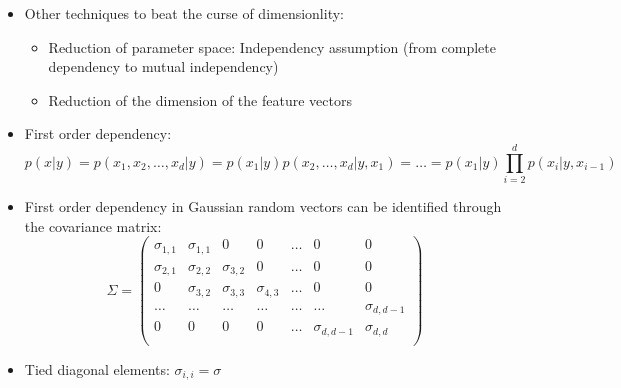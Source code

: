 \begin{itemize}
    \item
        Other techniques to beat the curse of dimensionlity:
        \begin{itemize}
            \item
                Reduction of parameter space: Independency assumption (from complete dependency to mutual independency)
            \item
                Reduction of the dimension of the feature vectors
        \end{itemize}
    \item
        First order dependency:
        $$ p(x|y) = p(x_1, x_2, \dots, x_d | y) = p(x_1|y) p( x_2, \dots, x_d | y, x_1) = \dots = p(x_1|y) \prod_{i=2}^d p(x_i|y, x_{i-1})$$
    \item
        First order dependency in Gaussian random vectors can be identified through the covariance matrix:
        $$
        \Sigma = 
        \begin{pmatrix}
            \sigma_{1,1} & \sigma_{1,1} & 0 & 0 & \dots & 0 & 0 \\ 
            \sigma_{2,1} & \sigma_{2,2} & \sigma_{3,2} & 0 & \dots & 0 & 0 \\
            0 & \sigma_{3,2} & \sigma_{3,3} & \sigma_{4,3} & \dots & 0 & 0 \\
            \dots &  \dots &\dots &\dots &\dots &\dots & \sigma_{d, d-1}\\
            0 & 0 & 0 & 0 & \dots & \sigma_{d, d-1} & \sigma_{d,d}\\
        \end{pmatrix}
        $$
    \item
        Tied diagonal elements: $\sigma_{i,i} = \sigma$ 
\end{itemize}

